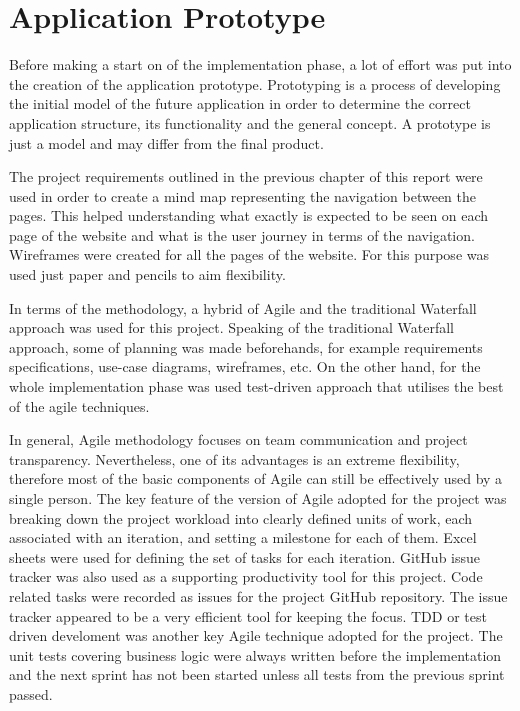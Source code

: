 \chapter{Application Prototype}
\label{ch:Prototype}

Before making a start on of the implementation phase, a lot of effort was put into the creation of the application prototype. Prototyping is a process of developing the initial model of the future application in order to determine the correct application structure, its functionality and the general concept. A prototype is just a model and may differ from the final product.

The project requirements outlined in the previous chapter of this report were used in order to create a mind map representing the navigation between the pages. This helped understanding what exactly is expected to be seen on each page of the website and what is the user journey in terms of the navigation. Wireframes were created for all the pages of the website. For this purpose was used just paper and pencils to aim flexibility.

In terms of the methodology, a hybrid of Agile and the traditional Waterfall approach was used for this project. Speaking of the traditional Waterfall approach, some of planning was made beforehands, for example requirements specifications, use-case diagrams, wireframes, etc. On the other hand, for the whole implementation phase was used test-driven approach that utilises the best of the agile techniques.

In general, Agile methodology focuses on team communication and project transparency. Nevertheless, one of its advantages is an extreme flexibility, therefore most of the basic components of Agile can still be effectively used by a single person. The key feature of the version of Agile adopted for the project was breaking down the project workload into clearly defined units of work, each associated with an iteration, and setting a milestone for each of them. Excel sheets were used for defining the set of tasks for each iteration. GitHub issue tracker was also used as a supporting productivity tool for this project. Code related tasks were recorded as issues for the project GitHub repository. The issue tracker appeared to be a very efficient tool for keeping the focus. TDD or test driven develoment was another key Agile technique adopted for the project. The unit tests covering business logic were always written before the implementation and the next sprint has not been started unless all tests from the previous sprint passed. 

